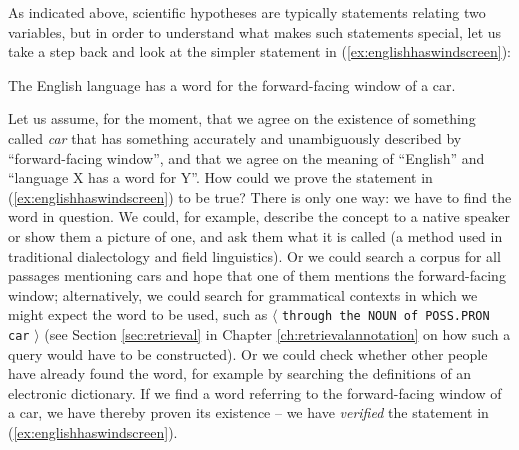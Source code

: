 As indicated above, scientific hypotheses are typically statements relating two variables, but in order to understand what makes such statements special, let us take a step back and look at the simpler statement in (\ref{ex:englishhaswindscreen}):

\begin{exe}
\ex The English language has a word for the forward-facing window of a car.
\label{ex:englishhaswindscreen}
\end{exe}

Let us assume, for the moment, that we agree on the existence of something called \textit{car} that has something accurately and unambiguously described by ``forward-facing window'', and that we agree on the meaning of ``English'' and ``language X has a word for Y''. How could we prove the statement in (\ref{ex:englishhaswindscreen}) to be true? There is only one way: we have to find the word in question. We could, for example, describe the concept  to a native speaker or show them a picture of one, and ask them what it is called (a method used in traditional dialectology and field linguistics). Or we could search a corpus for all passages mentioning cars and hope that one of them mentions the forward-facing window; alternatively, we could search for grammatical contexts in which we might expect the word to be used, such as $\langle$ \texttt{through the NOUN of POSS.PRON car} $\rangle$ (see Section \ref{sec:retrieval} in Chapter \ref{ch:retrievalannotation} on how such a query would have to be constructed). Or we could check whether other people have already found the word, for example by searching the definitions of an electronic dictionary. If we find a word referring to the forward-facing window of a car, we have thereby proven its existence -- we have \emph{verified} the statement in (\ref{ex:englishhaswindscreen}).


